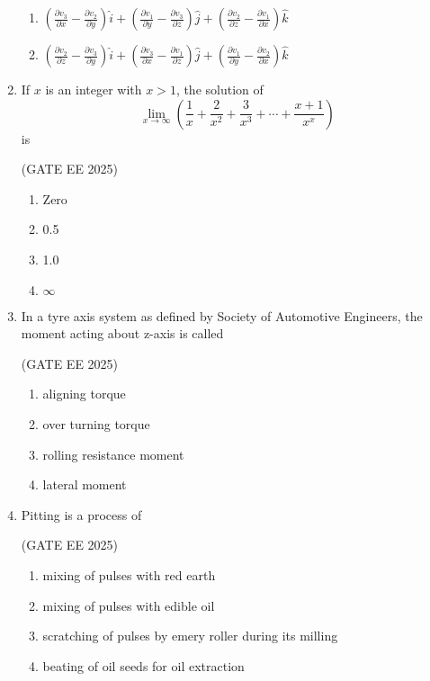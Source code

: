 \documentclass[journal,12pt,onecolumn]{IEEEtran}
\theoremstyle{remark}
\begin{document}
\begin{enumerate}
\begin{multicols}{2}
\begin{enumerate}
\item $\left(\frac{\partial v_{3}}{\partial x} - \frac{\partial v_{2}}{\partial y}\right)\hat{i}
+ \left(\frac{\partial v_{1}}{\partial y} - \frac{\partial v_{3}}{\partial z}\right)\hat{j}
+ \left(\frac{\partial v_{2}}{\partial z} - \frac{\partial v_{1}}{\partial x}\right)\hat{k}$

\item $\left(\frac{\partial v_{2}}{\partial z} - \frac{\partial v_{3}}{\partial y}\right)\hat{i}
+ \left(\frac{\partial v_{3}}{\partial x} - \frac{\partial v_{1}}{\partial z}\right)\hat{j}
+ \left(\frac{\partial v_{1}}{\partial y} - \frac{\partial v_{2}}{\partial x}\right)\hat{k}$
\end{enumerate}
\end{multicols}

\item If $x$ is an integer with $x > 1$, the solution of  
\[
\lim_{x\to\infty}\left(\frac{1}{x}+\frac{2}{x^2}+\frac{3}{x^3}+\cdots+\frac{x+1}{x^{x}}\right)
\]
is

\hfill(GATE EE 2025)

\begin{multicols}{4}
\begin{enumerate}
\item Zero
\item 0.5
\item 1.0
\item $\infty$
\end{enumerate}
\end{multicols}

\item In a tyre axis system as defined by Society of Automotive Engineers, the
moment acting about z-axis is called

\hfill(GATE EE 2025)

\begin{multicols}{2}
\begin{enumerate}
\item aligning torque
\item over turning torque
\item rolling resistance moment
\item lateral moment
\end{enumerate}
\end{multicols}

\item Pitting is a process of

\hfill(GATE EE 2025)

\begin{enumerate}
\item mixing of pulses with red earth
\item mixing of pulses with edible oil
\item scratching of pulses by emery roller during its milling
\item beating of oil seeds for oil extraction
\end{enumerate}


\end{enumerate}
\end{document}
